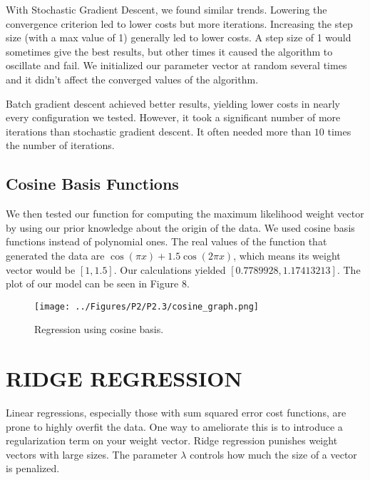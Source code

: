 \documentclass[a4paper,twoside]{article}
\begin{document}
With Stochastic Gradient Descent, we found similar trends. Lowering the convergence criterion led to lower costs but more iterations. Increasing the step size (with a max value of 1) generally led to lower costs. A step size of 1 would sometimes give the best results, but other times it caused the algorithm to oscillate and fail. We initialized our parameter vector at random several times and it didn't affect the converged values of the algorithm.  

Batch gradient descent achieved better results, yielding lower costs in nearly every configuration we tested. However, it took a significant number of more iterations than stochastic gradient descent. It often needed more than $10$ times the number of iterations. 

\subsection{Cosine Basis Functions}

We then tested our function for computing the maximum likelihood weight vector by using our prior knowledge about the origin of the data. We used cosine basis functions instead of polynomial ones. The real values of the function that generated the data are $\cos(\pi x)+1.5 \cos(2 \pi x)$, which means its weight vector would be $[1, 1.5]$. Our calculations yielded $[0.7789928, 1.17413213]$. The plot of our model can be seen in Figure 8.

\begin{figure}[h]
  \texttt{[image: ../Figures/P2/P2.3/cosine\_graph.png]}
  \caption{Regression using cosine basis.}
  \label{fig:gradient_converging}
\end{figure}

\vspace{40mm}


\section{\uppercase{Ridge Regression}}

Linear regressions, especially those with sum squared error cost functions, are prone to highly overfit the data. One way to ameliorate this is to introduce a regularization term on your weight vector. Ridge regression punishes weight vectors with large sizes. The parameter $\lambda$ controls how much the size of a vector is penalized. 
\end{document}
